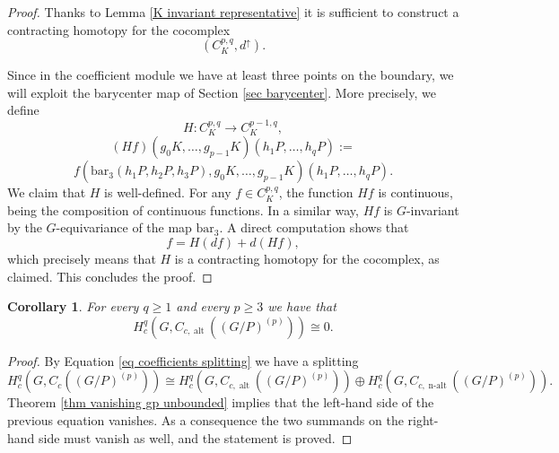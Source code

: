 \documentclass[a4paper]{amsart}
\newtheorem{cor}[lem]{Corollary}
\theoremstyle{definition}
\theoremstyle{remark}
\theoremstyle{TheoremNum}
\DeclareMathOperator{\alt}{\mathrm{alt}}
\DeclareMathOperator{\nalt}{\mathrm{n-alt}}
\begin{document}
\begin{proof}
Thanks to Lemma \ref{K invariant representative} it is sufficient to construct a contracting homotopy for the cocomplex 
$$
(C_K^{p,q},d^\uparrow).
$$

Since in the coefficient module we have at least three points on the boundary, we will exploit the barycenter map of Section \ref{sec barycenter}. More precisely, we define
$$
H:C_K^{p,q} \rightarrow C_K^{p-1,q},
$$ 
$$
(H f)(g_0K,\dots,g_{p-1}K)(h_1P,\ldots,h_qP):=
$$
$$
f(\mathrm{bar}_3(h_1P,h_2P,h_3P),g_0K,\ldots,g_{p-1}K)(h_1P,\ldots,h_qP). 
$$
We claim that $H$ is well-defined. For any $f \in C_K^{p,q}$, the function $Hf$ is continuous, being the composition of continuous functions. In a similar way, $Hf$ is $G$-invariant by the $G$-equivariance of the map $\mathrm{bar}_3$. A direct computation shows that 
$$
f=H(df)+d(Hf),
$$
which precisely means that $H$ is a contracting homotopy for the cocomplex, as claimed. This concludes the proof. 
\end{proof}

\begin{cor}\label{cor vanishing 3 points}
For every $q \geq 1$ and every $p \geq 3$ we have that 
$$
H^q_c(G,C_{c,\alt}((G/P)^{(p)})) \cong 0. 
$$
\end{cor}

\begin{proof}
By Equation \eqref{eq coefficients splitting} we have a splitting 
$$
H^q_c(G,C_c((G/P)^{(p)})) \cong H_c^q(G,C_{c,\alt}((G/P)^{(p)})) \oplus H_c^q(G,C_{c,\nalt}((G/P)^{(p)})).
$$
Theorem \ref{thm vanishing gp unbounded} implies that the left-hand side of the previous equation vanishes. As a consequence the two summands on the right-hand side must vanish as well, and the statement is proved. 
\end{proof}
\end{document}
